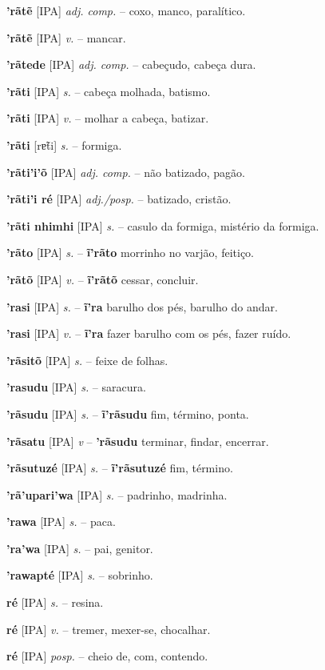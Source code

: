 \textbf{'rãtẽ} [IPA] \textit{adj. comp.} -- coxo, manco, paralítico.

\textbf{'rãtẽ} [IPA] \textit{v.} -- mancar.

\textbf{'rãtede} [IPA] \textit{adj. comp.} -- cabeçudo, cabeça dura.

\textbf{'rãti} [IPA] \textit{s.} -- cabeça molhada, batismo.

\textbf{'rãti} [IPA] \textit{v.} -- molhar a cabeça, batizar.

\textbf{'rãti} [rɐ̃ti] \textit{s.} -- formiga.

\textbf{'rãti'i'õ} [IPA] \textit{adj. comp.} -- não batizado, pagão.

\textbf{'rãti'i ré} [IPA] \textit{adj./posp.} -- batizado, cristão.

\textbf{'rãti nhimhi} [IPA] \textit{s.} -- casulo da formiga, mistério da formiga.

\textbf{'rãto} [IPA] \textit{s.} -- \textbf{ĩ'rãto} morrinho no varjão, feitiço.

\textbf{'rãtõ} [IPA] \textit{v.} -- \textbf{ĩ'rãtõ} cessar, concluir.

\textbf{'rasi} [IPA] \textit{s.} -- \textbf{ĩ'ra} barulho dos pés, barulho do andar.

\textbf{'rasi} [IPA] \textit{v.} -- \textbf{ĩ'ra} fazer barulho com os pés, fazer ruído.

\textbf{'rãsitõ} [IPA] \textit{s.} -- feixe de folhas.

\textbf{'rasudu} [IPA] \textit{s.} -- saracura.

\textbf{'rãsudu} [IPA] \textit{s.} -- \textbf{ĩ'rãsudu} fim, término, ponta.

\textbf{'rãsatu} [IPA] \textit{v} -- \textbf{'rãsudu} terminar, findar, encerrar.

\textbf{'rãsutuzé} [IPA] \textit{s.} -- \textbf{ĩ'rãsutuzé} fim, término.

\textbf{'rã'upari'wa} [IPA] \textit{s.} -- padrinho, madrinha.

\textbf{'rawa} [IPA] \textit{s.} -- paca.

\textbf{'ra'wa} [IPA] \textit{s.} -- pai, genitor.

\textbf{'rawapté} [IPA] \textit{s.} -- sobrinho.

\textbf{ré} [IPA] \textit{s.} -- resina.

\textbf{ré} [IPA] \textit{v.} -- tremer, mexer-se, chocalhar.

\textbf{ré} [IPA] \textit{posp.} -- cheio de, com, contendo.

